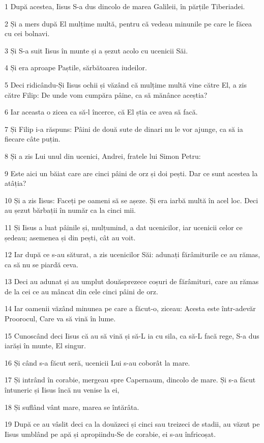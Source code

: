 \par 1 După acestea, Iisus S-a dus dincolo de marea Galileii, în părțile Tiberiadei.
\par 2 Și a mers după El mulțime multă, pentru că vedeau minunile pe care le făcea cu cei bolnavi.
\par 3 Și S-a suit Iisus în munte și a șezut acolo cu ucenicii Săi.
\par 4 Și era aproape Paștile, sărbătoarea iudeilor.
\par 5 Deci ridicându-Și Iisus ochii și văzând că mulțime multă vine către El, a zis către Filip: De unde vom cumpăra pâine, ca să mănânce aceștia?
\par 6 Iar aceasta o zicea ca să-l încerce, că El știa ce avea să facă.
\par 7 Și Filip i-a răspuns: Pâini de două sute de dinari nu le vor ajunge, ca să ia fiecare câte puțin.
\par 8 Și a zis Lui unul din ucenici, Andrei, fratele lui Simon Petru:
\par 9 Este aici un băiat care are cinci pâini de orz și doi pești. Dar ce sunt acestea la atâția?
\par 10 Și a zis Iisus: Faceți pe oameni să se așeze. Și era iarbă multă în acel loc. Deci au șezut bărbații în număr ca la cinci mii.
\par 11 Și Iisus a luat pâinile și, mulțumind, a dat ucenicilor, iar ucenicii celor ce ședeau; asemenea și din pești, cât au voit.
\par 12 Iar după ce s-au săturat, a zis ucenicilor Săi: adunați fărâmiturile ce au rămas, ca să nu se piardă ceva.
\par 13 Deci au adunat și au umplut douăsprezece coșuri de fărâmituri, care au rămas de la cei ce au mâncat din cele cinci pâini de orz.
\par 14 Iar oamenii văzând minunea pe care a făcut-o, ziceau: Acesta este într-adevăr Proorocul, Care va să vină în lume.
\par 15 Cunoscând deci Iisus că au să vină și să-L ia cu sila, ca să-L facă rege, S-a dus iarăși în munte, El singur.
\par 16 Și când s-a făcut seră, ucenicii Lui s-au coborât la mare.
\par 17 Și intrând în corabie, mergeau spre Capernaum, dincolo de mare. Și s-a făcut întuneric și Iisus încă nu venise la ei,
\par 18 Și suflând vânt mare, marea se întărâta.
\par 19 După ce au vâslit deci ca la douăzeci și cinci sau treizeci de stadii, au văzut pe Iisus umblând pe apă și apropiindu-Se de corabie, ei s-au înfricoșat.
